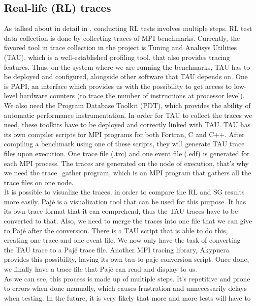 \subsection{Real-life (RL) traces}
\label{sec:rl_traces}
As talked about in detail in \cite{ms11}, conducting RL tests involves
multiple steps. RL test data collection is done by collecting traces
of MPI benchmarks. Currently, the favored tool in trace collection in
the project is Tuning and Analisys Utilities (TAU)\cite{sm06}, which
is a well-established profiling tool, that also provides tracing
features. Thus, on the system
where we are running the benchmarks, TAU has to be deployed and
configured, alongside other software that TAU depends on. One is
PAPI\cite{mbdh99}\cite{lmmsl01},
an interface which provides us with the possibility to
get access to low-level hardware counters (to trace the number of
instructions at processor level). We also need the Program Database
Toolkit (PDT)\cite{lcmsmrr00}, which provides the ability of automatic
performance
instrumentation. In order for TAU to collect the traces we need, these
toolkits have to be deployed and correctly linked with TAU. TAU has
its own compiler scripts for MPI programs for both Fortran, C and
C++. After compiling a benchmark using one of these scripts, they will
generate TAU trace files upon execution. One trace file (.trc)
and one event file (.edf) is generated for each MPI process. The
traces are generated on the node of execution, that's why we need the
trace\_gather program\cite{ms11}, which is an MPI program that gathers
all the trace files on one node.\\
It is possible to visualize the traces, in order to compare the RL and SG
results more easily. Pajé\cite{cob00} is a visualization tool that can
be used for this purpose. It has its own trace format that it can
comprehend, thus the TAU traces have to be converted to that. Also, we
need to merge the traces into one file that we can give to Pajé after
the conversion. There is a TAU script that is able to do this,
creating one trace and one event file. We now only have the task of
converting the TAU trace to a Pajé trace file. Another MPI tracing
library, Akypuera\cite{s13} provides this possibility, having its own
tau-to-paje conversion script. Once done, we finally have a trace file
that Pajé can read and display to us.\\
As we can see, this process is made up of multiple steps. It's
repetitive and prone to errors when done manually, which causes
frustration and unnecessarily delays when testing.
In the future, it is very likely that more and more tests will have to
